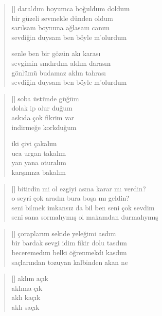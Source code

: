 \documentclass[a5paper, openright, twoside]{memoir}
\begin{document}
\begin{verse}[\versewidth]
  daraldım boyumca boğuldum doldum \\
  bir güzeli sevmekle dünden oldum \\
  sarılsam boynuna ağlasam canım \\
  sevdiğin duysam ben böyle m'olurdum

  senle ben bir gözün akı karası \\
  sevgimin sındırdım aldım darasın \\
  gönlümü budamaz aklın tahrası \\
  sevdiğin duysam ben böyle m'olurdum \\
\end{verse}
\begin{verse}[\versewidth]
  soba üstünde güğüm \\
  dolak ip olur duğum \\
  askıda çok fikrim var \\
  indirmeğe korkduğum

  iki çivi çakalım \\
  uca urgan takalım \\
  yan yana oturalım \\
  karşımıza bakalım \\
\end{verse}
\begin{verse}[\versewidth]
  bitirdin mi ol ezgiyi asma karar mı verdin? \\
  o seyri çok aradın bura boşa mı geldin? \\
  seni bilmek imkansız da bil ben seni çok sevdim \\
  seni sana sormalıymış ol makamdan durmalıymış \\
\end{verse}
\begin{verse}[\versewidth]
  çoraplarım sekide yeleğimi asdım \\
  bir bardak sevgi idim fikir dolu tasdım \\
  beceremedım belki öğrenmekdi kasdım \\
  saçlarından tozuyan kalbinden akan ne \\
\end{verse}
\begin{verse}[\versewidth]
  aklım açık \\
  aklıma çık \\
  aklı kaçık \\
  aklı saçık \\
\end{verse}
\end{document}
